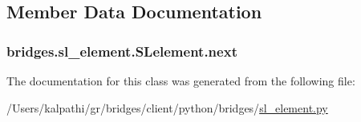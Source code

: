 \subsection{Member Data Documentation}
\hypertarget{classbridges_1_1sl__element_1_1_s_lelement_a4fa8e9321dd2ce726da047ddc64adabf}{}
\subsubsection[{next}]{\setlength{\rightskip}{0pt plus 5cm}bridges.\+sl\+\_\+element.\+S\+Lelement.\+next}\label{classbridges_1_1sl__element_1_1_s_lelement_a4fa8e9321dd2ce726da047ddc64adabf}


The documentation for this class was generated from the following file\+:\begin{DoxyCompactItemize}
\item 
/\+Users/kalpathi/gr/bridges/client/python/bridges/\hyperlink{sl__element_8py}{sl\+\_\+element.\+py}\end{DoxyCompactItemize}
